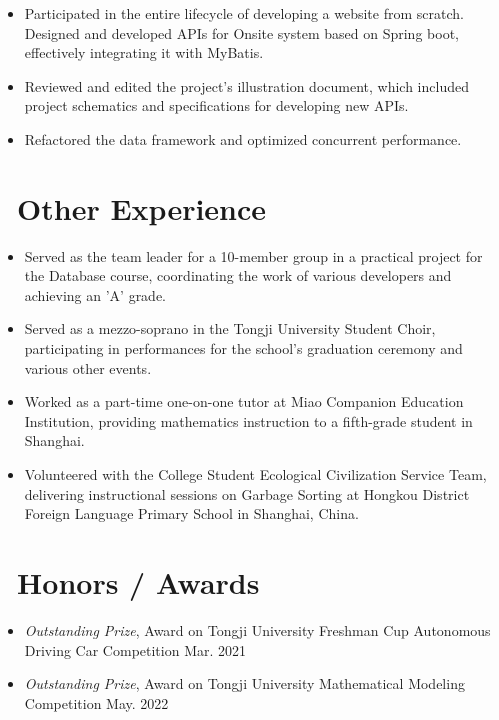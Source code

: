 \documentclass{resume}
\begin{document}
\begin{itemize}
  \item Participated in the entire lifecycle of developing a website from scratch. Designed and developed APIs for Onsite system based on Spring boot, effectively integrating it with MyBatis.
  \item Reviewed and edited the project’s illustration document, which included project schematics and specifications for developing new APIs.
  \item Refactored the data framework and optimized concurrent performance.
\end{itemize}


\section{\faUsers\ Other Experience}
\begin{itemize}[parsep=0.5ex]
  \item Served as the team leader for a 10-member group in a practical project for the Database course, coordinating the work of various developers and achieving an ’A’ grade.
  \item Served as a mezzo-soprano in the Tongji University Student Choir, participating in performances for the school’s graduation ceremony and various other events.
  \item Worked as a part-time one-on-one tutor at Miao Companion Education Institution, providing mathematics instruction to a fifth-grade student in Shanghai.
  \item Volunteered with the College Student Ecological Civilization Service Team, delivering instructional sessions on Garbage Sorting at Hongkou District Foreign Language Primary School in Shanghai, China.
\end{itemize}

\section{\faHeartO\ Honors / Awards}
\begin{itemize}[parsep=0.5ex]
  \item {\textit{Outstanding Prize}, Award on Tongji University Freshman Cup Autonomous Driving Car Competition }{Mar. 2021}
  \item {\textit{Outstanding Prize}, Award on Tongji University Mathematical Modeling Competition }{May. 2022}
\end{itemize}
\end{document}
